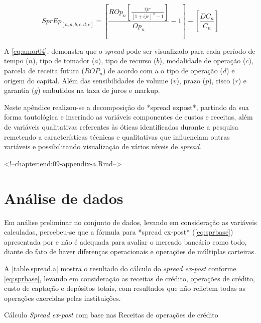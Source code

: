 \documentclass[
  12pt,
  12pt,
  openright,
  oneside,
  a4paper,
  chapter=TITLE,
  section=TITLE,
  subsection=TITLE,
  subsubsection=TITLE,
  portugues,
  sumario=tradicional]{abntex2}
\begin{document}
\begin{apendicesenv}
\begin{equation}\label{eq:amor04}
SprEp_{[n,a,b,c,d,e]} = \left[ \frac{ROp_{n}[\frac{   ijr_{}  }{  [1 + ijr_{}]^n -1  }]}{Op_{n}} -1 \right] - \left[ \frac{DC_{n}}{C_{n}} \right]
\end{equation}


A \autoref{eq:amor04}, demonstra que o \emph{spread} pode ser visualizado para cada período de tempo ($n$), tipo de tomador ($a$), tipo de recurso ($b$), modalidade de operação ($c$), parcela de receita futura ($ROP_{n}$) de acordo com a o tipo de operação ($d$) e origem do capital. Além das sensibilidades de volume ($v$), prazo ($p$), risco ($r$) e garantia ($g$) embutidos na taxa de juros e markup.   


Neste apêndice realizou-se a decomposição do *spread expost*, partindo da sua forma tautológica e inserindo as variáveis componentes de custos e receitas, além de variáveis qualitativas referentes às óticas identificadas durante a pesquisa remetendo a características técnicas e qualitativas que influenciam outras variáveis e possibilitando visualização de vários níveis de \emph{spread}.

<!--chapter:end:09-appendix-a.Rmd-->

\chapter{Análise de dados}\label{apendiceb}

Em análise preliminar no conjunto de dados, levando em consideração as variáveis calculadas, percebeu-se que a fórmula para *spread ex-post* (\autoref{eq:sprbase}) apresentada por \textcite{dantas:2012} e \textcite{timotio:2018} não é adequada para avaliar o mercado bancário como todo, diante do fato de haver diferenças operacionais e operações de múltiplas carteiras. 

A \autoref{table.spread.a} mostra o resultado do cálculo do \emph{spread ex-post} conforme \autoref{eq:sprbase}, levando em consideração as receitas de crédito, operações de crédito, custo de captação e depósitos totais, com resultados que não refletem todas as operações exercidas pelas instituições.



\begin{table}
\caption{Cálculo \emph{Spread ex-post} com base nas Receitas de operações de crédito}
\vspace{1mm}
\begingroup\fontsize{10}{12}\selectfont


\end{table}
\end{apendicesenv}
\end{document}
